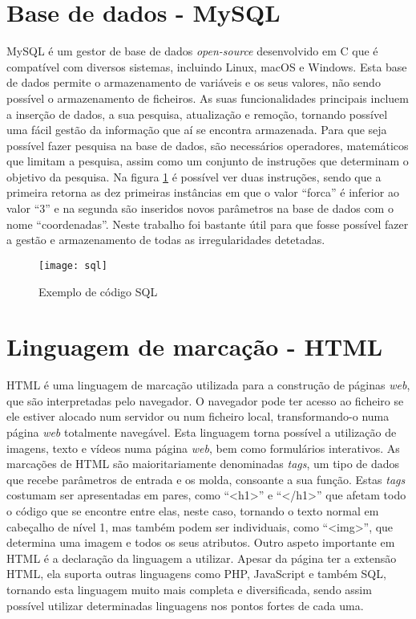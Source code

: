 \section{Base de dados - MySQL}
\label{sec:MySQL}

MySQL é um gestor de base de dados \emph{open-source} desenvolvido em C que é compatível com diversos sistemas, incluindo Linux, macOS e Windows.
Esta base de dados permite o armazenamento de variáveis e os seus valores, não sendo possível o armazenamento de ficheiros.
As suas funcionalidades principais incluem a inserção de dados, a sua pesquisa, atualização e remoção, tornando possível uma fácil gestão da informação que aí se encontra armazenada.
Para que seja possível fazer pesquisa na base de dados, são necessários operadores, matemáticos que limitam a pesquisa, assim como um conjunto de instruções que determinam o objetivo da pesquisa.
Na figura \ref{fig:sql} é possível ver duas instruções, sendo que a primeira retorna as dez primeiras instâncias em que o valor ``forca'' é inferior ao valor ``3'' e na segunda são inseridos novos parâmetros na base de dados com o nome ``coordenadas''.
Neste trabalho foi bastante útil para que fosse possível fazer a gestão e armazenamento de todas as irregularidades detetadas.

\begin{figure}[hbtp]
	\centering
	\texttt{[image: sql]}
	\caption{Exemplo de código SQL}
	\label{fig:sql}
\end{figure}

\section{Linguagem de marcação - HTML}
\label{sec:html}

HTML é uma linguagem de marcação utilizada para a construção de páginas \emph{web}, que são interpretadas pelo navegador.
O navegador pode ter acesso ao ficheiro se ele estiver alocado num servidor ou num ficheiro local, transformando-o numa página \emph{web} totalmente navegável.
Esta linguagem torna possível a utilização de imagens, texto e vídeos numa página \emph{web}, bem como formulários interativos.
As marcações de HTML são maioritariamente denominadas \emph{tags}, um tipo de dados que recebe parâmetros de entrada e os molda, consoante a sua função.
Estas \emph{tags} costumam ser apresentadas em pares, como ``<h1>'' e ``</h1>'' que afetam todo o código que se encontre entre elas, neste caso, tornando o texto normal em cabeçalho de nível 1, mas também podem ser individuais, como ``<img>'', que determina uma imagem e todos os seus atributos.
Outro aspeto importante em HTML é a declaração da linguagem a utilizar.
Apesar da página ter a extensão HTML, ela suporta outras linguagens como PHP, JavaScript e também SQL, tornando esta linguagem muito mais completa e diversificada, sendo assim possível utilizar determinadas linguagens nos pontos fortes de cada uma.

